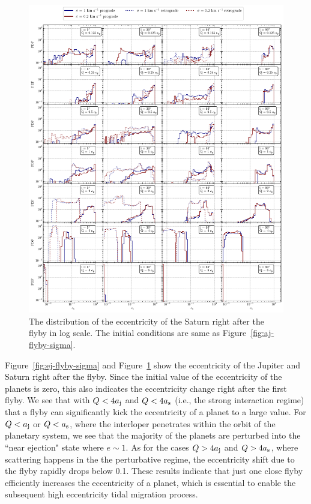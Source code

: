 \documentclass[twocolumn]{aastex63}
\newcommand*\fgr[1]{Figure~\ref{#1}}
\begin{document}
\begin{figure}
    \includegraphics[width=\textwidth]{figs/es-flyby-sigma.pdf}
    \caption{The distribution of the eccentricity of the Saturn right after the flyby in log scale.  The initial conditions are same as \fgr{fig:aj-flyby-sigma}.} 
    \label{fig:es-flyby-sigma}
\end{figure}

\fgr{fig:ej-flyby-sigma} and \fgr{fig:es-flyby-sigma} show the eccentricity of the Jupiter and Saturn right after the flyby. Since the initial value of the eccentricity of the planets is zero, this also indicates the eccentricity change right after the first flyby. We see that with $Q<4 a_{\rm j}$ and $Q < 4a_{\rm s}$ (i.e., the strong interaction regime) that a flyby can significantly kick the eccentricity of a planet to a large  value. For $Q < a_{\rm j}$ or $Q<a_{\rm s}$, where the interloper penetrates within the orbit of the planetary system, we see that the majority of the planets are perturbed into the ``near ejection" state where $e\sim 1$.  As for the cases $Q>4 a_{\rm j}$ and $Q > 4a_{\rm s}$, where scattering happens in the the perturbative regime, the eccentricity shift due to the flyby rapidly drops below 0.1. These results indicate that just one close flyby efficiently increases the eccentricity of a planet, which is essential to enable the subsequent high eccentricity tidal migration process.
\end{document}
